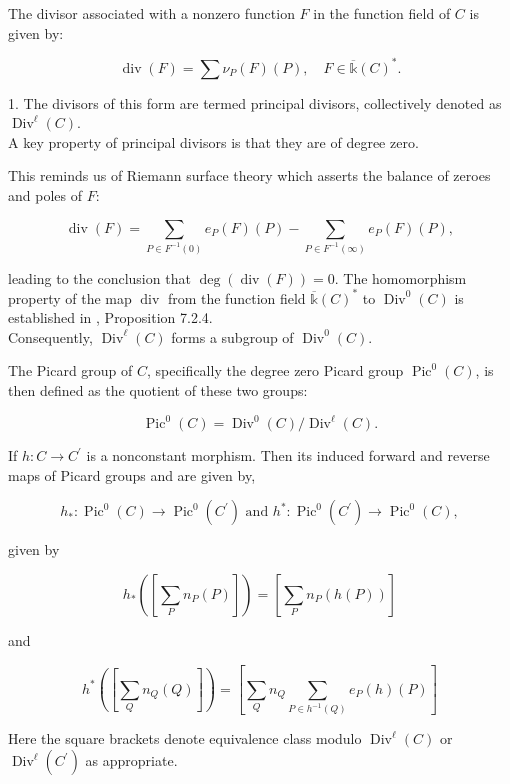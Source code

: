 \begin{definition}
The divisor associated with a nonzero function \( F \) in the function field of \( C \) is given by:

\[
\operatorname{div}(F) = \sum \nu_{P}(F)(P), \quad F \in \overline{\mathbb{k}}(C)^{*}.
\]
    
\end{definition}

\begin{remark}
1. The divisors of this form are termed principal divisors, collectively denoted as \(\operatorname{Div}^{\ell}(C)\). \\
A key property of principal divisors is that they are of degree zero.    
\end{remark}
 This reminds us of Riemann surface theory which asserts the balance of zeroes and poles of \( F \):

\[
\operatorname{div}(F) = \sum_{P \in F^{-1}(0)} e_{P}(F)(P) - \sum_{P \in F^{-1}(\infty)} e_{P}(F)(P),
\]

leading to the conclusion that \(\operatorname{deg}(\operatorname{div}(F)) = 0\). The homomorphism property of the map \( \operatorname{div} \) from the function field \(\overline{\mathbb{k}}(C)^{*}\) to \(\operatorname{Div}^{0}(C)\) is established in \cite{diamond2005first}, Proposition 7.2.4. \\
Consequently, \(\operatorname{Div}^{\ell}(C)\) forms a subgroup of \(\operatorname{Div}^{0}(C)\). 

\begin{definition}
The Picard group of \( C \), specifically the degree zero Picard group \(\operatorname{Pic}^{0}(C)\), is then defined as the quotient of these two groups:

\[
\operatorname{Pic}^{0}(C) = \operatorname{Div}^{0}(C) / \operatorname{Div}^{\ell}(C).
\]
    
\end{definition}

\begin{definition}
    If $h: C \longrightarrow C^{\prime}$ is a nonconstant morphism. Then its induced forward and reverse maps of Picard groups and are given by,

$$
h_{*}: \operatorname{Pic}^{0}(C) \longrightarrow \operatorname{Pic}^{0}\left(C^{\prime}\right) \text { and } h^{*}: \operatorname{Pic}^{0}\left(C^{\prime}\right) \longrightarrow \operatorname{Pic}^{0}(C),
$$

given by

$$
h_{*}\left(\left[\sum_{P} n_{P}(P)\right]\right)=\left[\sum_{P} n_{P}(h(P))\right]
$$

and

$$
h^{*}\left(\left[\sum_{Q} n_{Q}(Q)\right]\right)=\left[\sum_{Q} n_{Q} \sum_{P \in h^{-1}(Q)} e_{P}(h)(P)\right]
$$
\end{definition}
Here the square brackets denote equivalence class modulo $\operatorname{Div}^{\ell}(C)$ or $\operatorname{Div}^{\ell}\left(C^{\prime}\right)$ as appropriate. 

